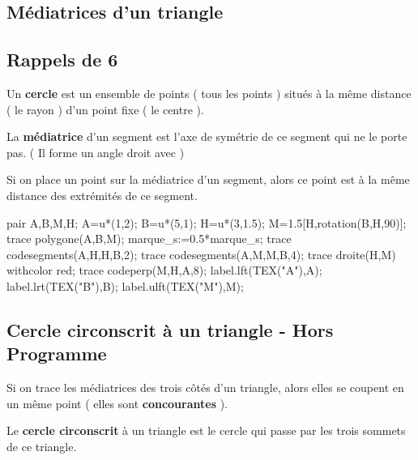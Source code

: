 \begin{changemargin}{0mm}{-15mm}
    \section{Médiatrices d'un triangle}
    \subsection{Rappels de 6}
    \begin{minipage}{0.7\linewidth}
        \begin{definition}
            Un \textbf{cercle} est un ensemble de points ( tous les points ) situés à la même distance ( le rayon ) d'un point fixe ( le centre ).
        \end{definition}
        \begin{definition}
            La \textbf{médiatrice} d'un segment est l'axe de symétrie de ce segment qui ne le porte pas. ( Il forme un angle droit avec )
        \end{definition}
        \begin{propriete}
            Si on place un point sur la médiatrice d'un segment, alors ce point est à la même distance des extrémités de ce segment.
        \end{propriete}
    \end{minipage}
    \begin{minipage}{0.3\linewidth}
        \begin{Geometrie}[CoinHD={(5.5u,5.5u)}]
            pair A,B,M,H;
            A=u*(1,2);
            B=u*(5,1);
            H=u*(3,1.5);
            M=1.5[H,rotation(B,H,90)];
            trace polygone(A,B,M);
            marque_s:=0.5*marque_s;
            trace codesegments(A,H,H,B,2);
            trace codesegments(A,M,M,B,4);
            trace droite(H,M) withcolor red;
            trace codeperp(M,H,A,8);
            label.lft(TEX("A"),A);
            label.lrt(TEX("B"),B);
            label.ulft(TEX("M"),M);
        \end{Geometrie}
    \end{minipage}

    \subsection{Cercle circonscrit à un triangle - Hors Programme}
    \begin{propriete}[\admise]
        Si on trace les médiatrices des trois côtés d'un triangle, alors elles se coupent en un même point ( elles sont \textbf{concourantes} ).
    \end{propriete}
    \begin{definition}
        Le \textbf{cercle circonscrit} à un triangle est le cercle qui passe par les trois sommets de ce triangle.
    \end{definition}


\end{changemargin}

